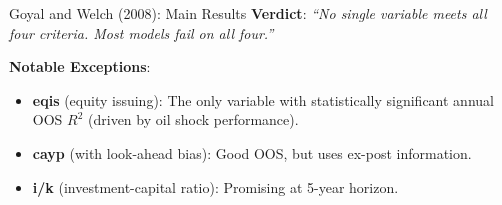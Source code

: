 \documentclass{beamer}
\begin{document}
\begin{frame}[allowframebreaks]{Goyal and Welch (2008): Main Results}
    \vspace{0.3cm}
    \textbf{Verdict}: \textit{``No single variable meets all four criteria. Most models fail on all four.''}

    \vspace{0.3cm}
    \textbf{Notable Exceptions}:
    \begin{itemize}
        \item \textbf{eqis} (equity issuing): The only variable with statistically significant annual OOS $R^2$ (driven by oil shock performance).
        \item \textbf{cayp} (with look-ahead bias): Good OOS, but uses ex-post information.
        \item \textbf{i/k} (investment-capital ratio): Promising at 5-year horizon.
    \end{itemize}
\end{frame}
\end{document}
